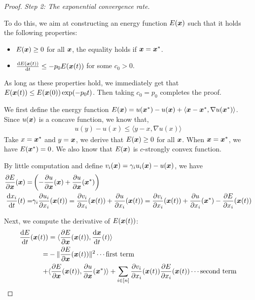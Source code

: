 \begin{proof}
\emph{Step 2: The exponential convergence rate.}

To do this, we aim at constructing an energy function $E({\bm{x}})$ such that it holds the following properties:
\begin{itemize}
    \item $E({\bm{x}}) \ge 0$ for all ${\bm{x}}$, the equality holds if ${\bm{x}} = {\bm{x}}^*$.
    \item $\frac{\mathrm{d} E({\bm{x}}(t))}{\mathrm{d} t} \le -p_0 E({\bm{x}}(t))$ for some $c_0 > 0$.
\end{itemize}

As long as these properties hold, we immediately get that $E({\bm{x}}(t)) \le E({\bm{x}}(0)) \exp(-p_0 t)$. Then taking $c_0 = p_0$ completes the proof.

We first define the energy function $E({\bm{x}}) = u({\bm{x}}^*) - u({\bm{x}}) + \langle {\bm{x}} - {\bm{x}}^* , \nabla u({\bm{x}}^*) \rangle$. Since $u({\bm{x}})$ is a concave function, we know that,
\begin{align*}
    u(y) - u(x) \le \langle y-x, \nabla u(x)\rangle
\end{align*}
Take $x = {\bm{x}}^*$ and $y = {\bm{x}}$, we derive that $E({\bm{x}}) \ge 0$ for all ${\bm{x}}$. When ${\bm{x}} = {\bm{x}}^*$, we have $E({\bm{x}}^*) = 0$. We also know that $E({\bm{x}})$ is $c$-strongly convex function.

By little computation and define $v_i({\bm{x}}) = \gamma_i u_i({\bm{x}}) - u({\bm{x}})$, we have
\begin{align*}
    \frac{\partial E}{\partial {\bm{x}}}({\bm{x}}) =& \left(- \frac{\partial u}{\partial {\bm{x}}}({\bm{x}}) + \frac{\partial u}{\partial {\bm{x}}}({\bm{x}}^*)\right)
    \\
    \frac{\mathrm{d} x_i}{\mathrm{d} t}(t) =& \gamma_i \frac{\partial u_i}{\partial x_i}({\bm{x}}(t))
    = \frac{\partial v_i}{\partial x_i}({\bm{x}}(t)) + \frac{\partial u}{\partial x_i}({\bm{x}}(t))
    = \frac{\partial v_i}{\partial x_i}({\bm{x}}(t)) + \frac{\partial u}{\partial x_i}({\bm{x}}^*) - \frac{\partial E}{\partial x_i}({\bm{x}}(t))
\end{align*}

Next, we compute the derivative of $E({\bm{x}}(t))$:
\begin{align*}
    \frac{\mathrm{d} E}{\mathrm{d} t}({\bm{x}}(t))
   & =\langle \frac{\partial E}{\partial {\bm{x}}}({\bm{x}}(t)), \frac{\mathrm{d} {\bm{x}}}{\mathrm{d} t}(t)\rangle
    \\
    =& - \| \frac{\partial E}{\partial {\bm{x}}}({\bm{x}}(t)) \|^2 \cdots\text{first term}
    \\
    +& \langle \frac{\partial E}{\partial {\bm{x}}}({\bm{x}}(t)), \frac{\partial u}{\partial {\bm{x}}}({\bm{x}}^*) \rangle
    + \sum_{i\in[n]} \frac{\partial v_i}{\partial x_i}({\bm{x}}(t)) \frac{\partial E}{\partial x_i}({\bm{x}}(t)) \cdots\text{second term}
    \\
\end{align*}


\end{proof}
